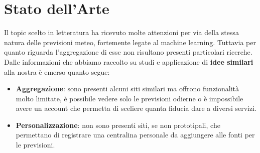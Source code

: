 

\chapter{Stato dell'Arte}
Il topic scelto in letteratura ha ricevuto molte attenzioni per via della stessa natura delle previsioni meteo, fortemente legate al machine learning. Tuttavia per quanto riguarda l'aggregazione di esse non risultano presenti particolari ricerche.
Dalle informazioni che abbiamo raccolto su studi e applicazione di \textbf{idee similari} alla nostra è emerso quanto segue:

\begin{itemize}
    \item \textbf{Aggregazione}: sono presenti alcuni siti similari ma offrono funzionalità molto limitate, è possibile vedere solo le previsioni odierne o è impossibile avere un account che permetta di sceliere quanta fiducia dare a diversi servizi. 
    \item \textbf{Personalizzazione}: non sono presenti siti, se non prototipali, che permettano di registrare una centralina personale da aggiungere alle fonti per le previsioni.
\end{itemize}
 

